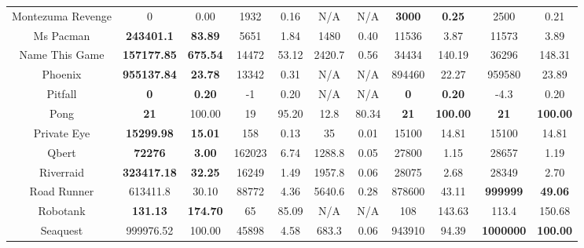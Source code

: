 \documentclass[nohyperref]{article}
\newcommand{\best}[1]{\textbf{#1}}
\theoremstyle{plain}
\begin{document}
\begin{table}[!hb]
\begin{center}
\begin{tabular}{| c |c c| c c| c c| c c| c c| }
 Montezuma Revenge  & 0                       & 0.00         & 1932              &0.16       &N/A       & N/A     & \best{3000}          & \best{0.25  } &2500            &0.21  \\
 Ms Pacman          & \textbf{243401.1 }      & \textbf{83.89   }  & 5651     &1.84       &1480      & 0.40    & 11536       & 3.87       &11573           &3.89     \\
 Name This Game     & \textbf{157177.85}      & \textbf{675.54  }  & 14472    &53.12          &2420.7    & 0.56    & 34434       & 140.19 &36296           &148.31        \\
 Phoenix            & \textbf{955137.84}      & \textbf{23.78   }  & 13342     &0.31       &N/A       & N/A     & 894460      & 22.27     &959580          &23.89     \\
 Pitfall            & \textbf{0}                       & \textbf{0.20}               & -1                 &0.20       &N/A       & N/A     & \best{0} & \best{0.20} &-4.3            &0.20     \\
 Pong               & \textbf{21}                      & 100.00             & 19                 &95.20          & 12.8     & 80.34   & \best{21} & \best{100.00} &\textbf{21}              &\textbf{100.00}   \\
 Private Eye        & \textbf{15299.98 }      & \textbf{15.01}     & 158       &0.13       & 35       & 0.01    & 15100       & 14.81             &15100           &14.81     \\
 Qbert              & \textbf{72276          }& \textbf{3.00}      & 162023    &6.74       & 1288.8   & 0.05    & 27800       & 1.15              &28657           &1.19 \\
 Riverraid          & \textbf{323417.18}      & \textbf{32.25}     & 16249    &1.49       & 1957.8   & 0.06    & 28075       & 2.68               &28349           &2.70\\
 Road Runner        & 613411.8                & 30.10              & 88772             &4.36       & 5640.6   & 0.28       & 878600 & 43.11   &\textbf{999999}          &\textbf{49.06}   \\
 Robotank           & \textbf{131.13}         & \textbf{174.70}    & 65        &85.09          & N/A      & N/A     & 108         & 143.63        &113.4           &150.68 \\
 Seaquest           & 999976.52               & 100.00             & 45898             &4.58       & 683.3             & 0.06    &943910	             &94.39 &\textbf{1000000}          &\textbf{100.00}\\

\end{tabular}
\end{center}
\end{table}
\end{document}
